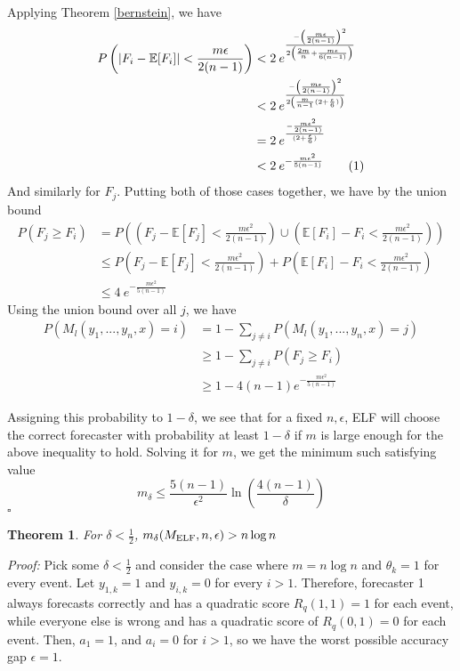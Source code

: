\documentclass[letterpaper,12pt]{article}
\newcommand{\E}{\mathbb{E}}
\newcommand{\1}{\mathbbm{1}}
\newcommand*{\QED}{\hfill\ensuremath{\square}}%
\newcommand\numberthis{\addtocounter{equation}{1}\tag{\theequation}}
\newtheorem{theorem}{Theorem}
\begin{document}
Applying Theorem \ref{bernstein}, we have
\begin{align*}
    P\left(\left| F_i - \E[F_i]\right| < \frac{m \epsilon}{2(n - 1)} \right) 
    &< 2 \: e^{\frac{-\left(\frac{m \epsilon}{2(n - 1)}\right)^2 }{2\left(\frac{2m}{n} + \frac{m \epsilon}{6(n - 1)}\right)}} \\
    &< 2 \: e^{\frac{-\left(\frac{m \epsilon}{2(n - 1)}\right)^2 }{2\left(\frac{m}{n-1}(2 + \frac{\epsilon}{6}) \right)}} \\
    &= 2 \: e^{\frac{-\frac{m \epsilon^2}{2(n - 1)} }{(2 + \frac{\epsilon}{6})}} \\
    &< 2 \: e^{-\frac{m \epsilon^2}{5(n - 1)} }  \numberthis \label{elf_bernstein} 
\end{align*}
And similarly for $F_j$. Putting both of those cases together, we have by the union bound
\begin{align*}
  P(F_j \geq F_i) &= P\left(\left(F_j - \E[F_j] < \frac{m \epsilon^2}{2(n - 1)}\right) \cup \left(\E[F_i] - F_i < \frac{m \epsilon^2}{2(n - 1)} \right) \right) \\
  &\leq P\left(F_j - \E[F_j] < \frac{m \epsilon^2}{2(n - 1)}\right) + P\left(\E[F_i] - F_i < \frac{m \epsilon^2}{2(n - 1)} \right) \\
  &\leq 4 \: e^{-\frac{m \epsilon^2}{5(n - 1)} }
\end{align*}
Using the union bound over all $j$, we have
\begin{align*}
  P\left(M_l(y_1, ..., y_n, x) = i\right)
  &= 1 - \sum_{j\neq i} P\left(M_l(y_1, ..., y_n, x) = j\right) \\
  &\geq 1 - \sum_{j\neq i} P\left(F_j \geq F_i\right) \\
  &\geq 1 - 4 (n-1) e^{-\frac{m \epsilon^2}{5(n - 1)}} 
\end{align*}

Assigning this probability to $1 - \delta$, we see that for a fixed $n, \epsilon$, ELF will choose the correct forecaster with probability at least $1 - \delta$ if $m$ is large enough for the above inequality to hold. Solving it for $m$, we get the minimum such satisfying value
\[m_\delta \leq \frac{5(n-1)}{\epsilon^2}\ln\left(\frac{4(n-1)}{\delta}\right) \]
\hfill\QED

\begin{theorem}
  \label{elf_lower_bound}
    For $\delta < \frac{1}{2}$, $m_\delta(M_{\mathrm{ELF}}, n, \epsilon) > n \log n$
\end{theorem}
\emph{Proof:} Pick some $\delta < \frac{1}{2}$ and consider the case where $m = n \log n$ and $\theta_k = 1$ for every event. Let $y_{1, k} = 1$ and $y_{i, k} = 0$ for every $i > 1$. Therefore, forecaster 1 always forecasts correctly and has a quadratic score $R_q(1, 1) = 1$ for each event, while everyone else is wrong and has a quadratic score of $R_q(0, 1) = 0$ for each event. Then, $a_1 = 1$, and $a_i = 0$ for $i > 1$, so we have the worst possible accuracy gap $\epsilon = 1$.
\end{document}

